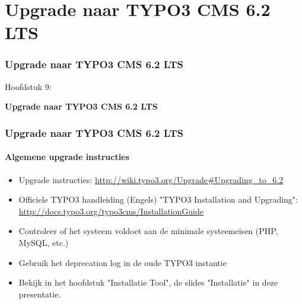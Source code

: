 %

\section{Upgrade naar TYPO3 CMS 6.2 LTS}
\begin{frame}[fragile]
	\frametitle{Upgrade naar TYPO3 CMS 6.2 LTS}

	\begin{center}\huge{Hoofdstuk 9:}\end{center}
	\begin{center}\huge{\color{typo3darkgrey}\textbf{Upgrade naar TYPO3 CMS 6.2 LTS}}\end{center}

\end{frame}


\begin{frame}[fragile]
	\frametitle{Upgrade naar TYPO3 CMS 6.2 LTS}
	\framesubtitle{Algemene upgrade instructies}

	\begin{itemize}

		\item Upgrade instructies:\newline
			\smaller\url{http://wiki.typo3.org/Upgrade#Upgrading_to_6.2}\normalsize
		\item Officiele TYPO3 handleiding (Engels) "TYPO3 Installation and Upgrading":
			\smaller\url{http://docs.typo3.org/typo3cms/InstallationGuide}\normalsize
		\item Controleer of het systeem voldoet aan de minimale systeemeisen (PHP, MySQL, etc.)
		\item Gebruik het deprecation log in de oude TYPO3 instantie
		\item Bekijk in het hoofdstuk "Installatie Tool", de slides "Installatie" in deze presentatie.
	\end{itemize}

\end{frame}


